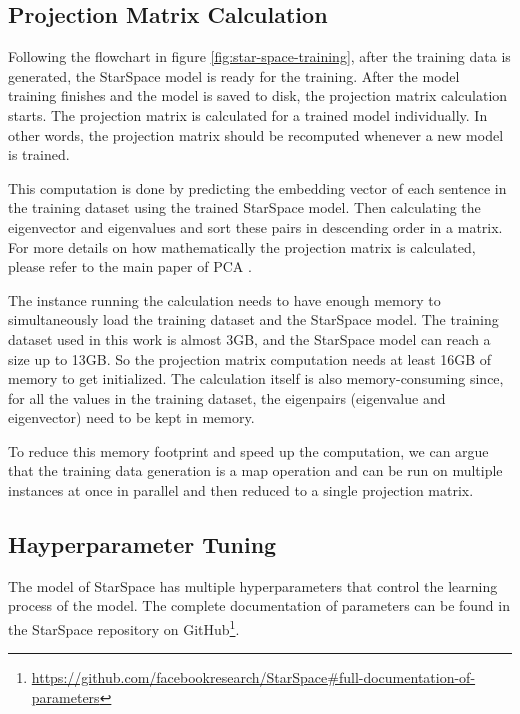 \subsection{Projection Matrix Calculation}
\label{subsec:projection-matrix-calculation}
Following the flowchart in figure \ref{fig:star-space-training}, after the training data is generated, the StarSpace model is ready for the training. After the model training finishes and the model is saved to disk, the projection matrix calculation starts. The projection matrix is calculated for a trained model individually. In other words, the projection matrix should be recomputed whenever a new model is trained.


This computation is done by predicting the embedding vector of each sentence in the training dataset using the trained StarSpace model. Then calculating the eigenvector and eigenvalues and sort these pairs in descending order in a matrix. For more details on how mathematically the projection matrix is calculated, please refer to the main paper of PCA \cite{woldPrincipalComponentAnalysis}.


The instance running the calculation needs to have enough memory to simultaneously load the training dataset and the StarSpace model. The training dataset used in this work is almost 3GB, and the StarSpace model can reach a size up to 13GB. So the projection matrix computation needs at least 16GB of memory to get initialized. The calculation itself is also memory-consuming since, for all the values in the training dataset, the eigenpairs (eigenvalue and eigenvector) need to be kept in memory.



To reduce this memory footprint and speed up the computation, we can argue that the training data generation is a map operation and can be run on multiple instances at once in parallel and then reduced to a single projection matrix.


\subsection{Hayperparameter Tuning}
\label{subsec:hyperparameter-tuning}
The model of StarSpace has multiple hyperparameters that control the learning process of the model. The complete documentation of parameters can be found in the StarSpace repository on GitHub\footnote{\url{https://github.com/facebookresearch/StarSpace\#full-documentation-of-parameters}}. 


